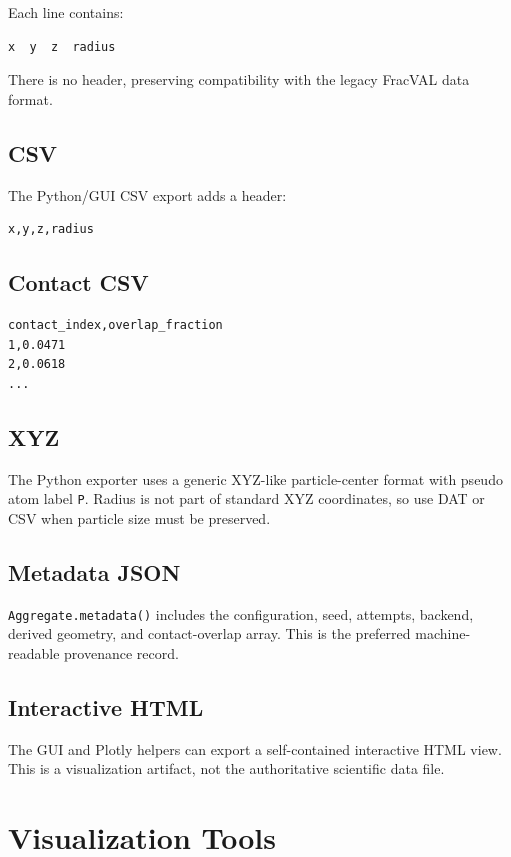 \documentclass[11pt,oneside]{report}
\newcommand{\code}[1]{\texttt{#1}}
\begin{document}
Each line contains:

\begin{lstlisting}
x  y  z  radius
\end{lstlisting}

There is no header, preserving compatibility with the legacy FracVAL data
format.

\section{CSV}

The Python/GUI CSV export adds a header:

\begin{lstlisting}
x,y,z,radius
\end{lstlisting}

\section{Contact CSV}

\begin{lstlisting}
contact_index,overlap_fraction
1,0.0471
2,0.0618
...
\end{lstlisting}

\section{XYZ}

The Python exporter uses a generic XYZ-like particle-center format with pseudo
atom label \code{P}. Radius is not part of standard XYZ coordinates, so use DAT
or CSV when particle size must be preserved.

\section{Metadata JSON}

\code{Aggregate.metadata()} includes the configuration, seed, attempts,
backend, derived geometry, and contact-overlap array. This is the preferred
machine-readable provenance record.

\section{Interactive HTML}

The GUI and Plotly helpers can export a self-contained interactive HTML view.
This is a visualization artifact, not the authoritative scientific data file.

\chapter{Visualization Tools}
\end{document}
